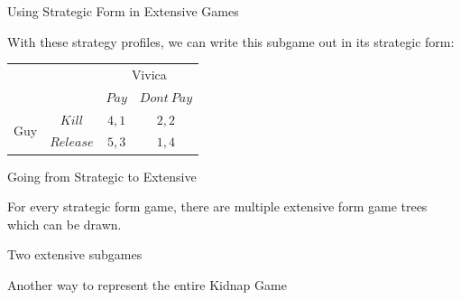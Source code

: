 \documentclass{beamer}
\theoremstyle{plain}
\begin{document}
\begin{frame}{Using Strategic Form in Extensive Games}

  With these strategy profiles,
  we can write this subgame out in its strategic form:

  \begin{table}
  \centering
	  \begin{tabular}{cc|c|c|}
	  	& \multicolumn{1}{c}{} & \multicolumn{2}{c}{Vivica}\\
	  	& \multicolumn{1}{c}{} & \multicolumn{1}{c}{$Pay$}  & \multicolumn{1}{c}{$Dont~Pay$} \\\cline{3-4}
      \multirow{2}{*}{Guy}  & $Kill$ & $4,1$ & $2,2$ \\\cline{3-4}
	  	& $Release$ & $5,3$ & $1,4$ \\\cline{3-4}
	  \end{tabular}
  \end{table}

\end{frame}


\begin{frame}{Going from Strategic to Extensive}
  
  For every strategic form game, 
  there are multiple extensive form game trees
  which can be drawn.

\end{frame}


\begin{frame}{Two extensive subgames}
  \begin{minipage}{.4\textwidth}
    \centering
    
  \end{minipage}
  \begin{minipage}{.4\textwidth}
    \centering
    
  \end{minipage}
\end{frame}


\begin{frame}{Another way to represent the entire Kidnap Game}
  \begin{center}
    
  \end{center}
\end{frame}
\end{document}
